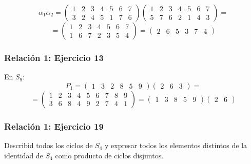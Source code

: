 \documentclass[11pt,a4paper]{article}
\begin{document}
\begin{equation*}
\alpha_{1}\alpha_{2} = 
\begin{pmatrix}
1 & 2 & 3 & 4 & 5 & 6 & 7 \\
3 & 2 & 4 & 5 & 1 & 7 & 6
\end{pmatrix}
\begin{pmatrix}
1 & 2 & 3 & 4 & 5 & 6 & 7 \\
5 & 7 & 6 & 2 & 1 & 4 & 3
\end{pmatrix}
=
\end{equation*}
\begin{equation*}
=
\begin{pmatrix}
1 & 2 & 3 & 4 & 5 & 6 & 7 \\
1 & 6 & 7 & 2 & 3 & 5 & 4
\end{pmatrix}
=
\begin{pmatrix}
2 & 6 & 5 & 3 & 7 & 4
\end{pmatrix}
\end{equation*}

\subsubsection*{Relación 1: Ejercicio 13}

En $S_{9}$:
\begin{equation*}
P_{1} =
\begin{pmatrix}
1 & 3 & 2 & 8 & 5 & 9
\end{pmatrix}
\begin{pmatrix}
2 & 6 & 3
\end{pmatrix}
=
\end{equation*}
\begin{equation*}
=
\begin{pmatrix}
1 & 2 & 3 & 4 & 5 & 6 & 7 & 8 & 9 \\
3 & 6 & 8 & 4 & 9 & 2 & 7 & 4 & 1
\end{pmatrix}
=
\begin{pmatrix}
1 & 3 & 8 & 5 & 9
\end{pmatrix}
\begin{pmatrix}
2 & 6
\end{pmatrix}
\end{equation*}

\subsubsection*{Relación 1: Ejercicio 19}

Describid todos los ciclos de $S_{4}$ y expresar todos los elementos distintos de la identidad de $S_{4}$ como producto de ciclos disjuntos.
\end{document}
